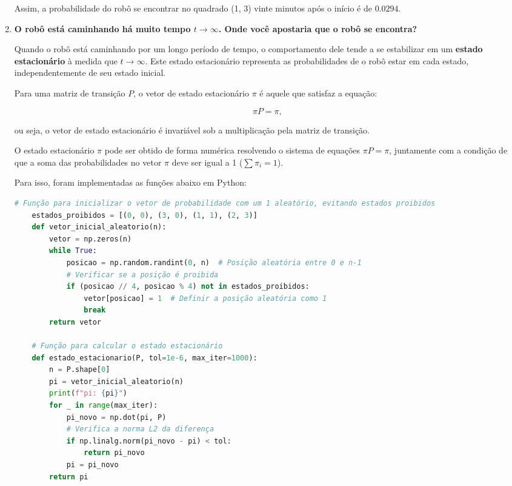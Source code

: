 \begin{enumerate}
    Assim, a probabilidade do robô se encontrar no quadrado (1, 3) vinte minutos após o início é de $\boldsymbol{0.0294}$.

    \item \textbf{O robô está caminhando há muito tempo $t \to \infty$. Onde você apostaria que o robô se encontra?}
    
    Quando o robô está caminhando por um longo período de tempo, o comportamento dele tende a se estabilizar em um \textbf{estado estacionário} à medida que \( t \to \infty \). Este estado estacionário representa as probabilidades de o robô estar em cada estado, independentemente de seu estado inicial.

    Para uma matriz de transição \( P \), o vetor de estado estacionário \( \pi \) é aquele que satisfaz a equação:

    $$
    \pi P = \pi,
    $$

ou seja, o vetor de estado estacionário é invariável sob a multiplicação pela matriz de transição.

O estado estacionário \( \pi \) pode ser obtido de forma numérica resolvendo o sistema de equações $ \pi P = \pi $, juntamente com a condição de que a soma das probabilidades no vetor \( \pi \) deve ser igual a 1 (\( \sum \pi_i = 1 \)).

Para isso, foram implementadas as funções abaixo em Python:

\begin{lstlisting}[language=Python]
    # Função para inicializar o vetor de probabilidade com um 1 aleatório, evitando estados proibidos
    estados_proibidos = [(0, 0), (3, 0), (1, 1), (2, 3)]
    def vetor_inicial_aleatorio(n):
        vetor = np.zeros(n)
        while True:
            posicao = np.random.randint(0, n)  # Posição aleatória entre 0 e n-1
            # Verificar se a posição é proibida
            if (posicao // 4, posicao % 4) not in estados_proibidos:
                vetor[posicao] = 1  # Definir a posição aleatória como 1
                break
        return vetor
    
    # Função para calcular o estado estacionário
    def estado_estacionario(P, tol=1e-6, max_iter=1000):
        n = P.shape[0]
        pi = vetor_inicial_aleatorio(n)
        print(f"pi: {pi}")
        for _ in range(max_iter):
            pi_novo = np.dot(pi, P)
            # Verifica a norma L2 da diferença
            if np.linalg.norm(pi_novo - pi) < tol:
                return pi_novo
            pi = pi_novo
        return pi
\end{lstlisting}


\end{enumerate}
